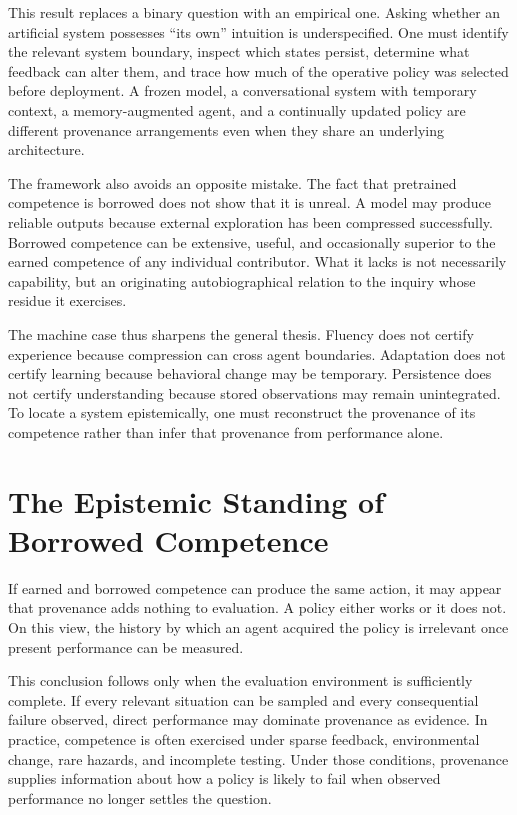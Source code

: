 \documentclass[11pt]{article}
\begin{document}
This result replaces a binary question with an empirical one. Asking whether an artificial system possesses ``its own'' intuition is underspecified. One must identify the relevant system boundary, inspect which states persist, determine what feedback can alter them, and trace how much of the operative policy was selected before deployment. A frozen model, a conversational system with temporary context, a memory-augmented agent, and a continually updated policy are different provenance arrangements even when they share an underlying architecture.

The framework also avoids an opposite mistake. The fact that pretrained competence is borrowed does not show that it is unreal. A model may produce reliable outputs because external exploration has been compressed successfully. Borrowed competence can be extensive, useful, and occasionally superior to the earned competence of any individual contributor. What it lacks is not necessarily capability, but an originating autobiographical relation to the inquiry whose residue it exercises.

The machine case thus sharpens the general thesis. Fluency does not certify experience because compression can cross agent boundaries. Adaptation does not certify learning because behavioral change may be temporary. Persistence does not certify understanding because stored observations may remain unintegrated. To locate a system epistemically, one must reconstruct the provenance of its competence rather than infer that provenance from performance alone.

\section{The Epistemic Standing of Borrowed Competence}

If earned and borrowed competence can produce the same action, it may appear that provenance adds nothing to evaluation. A policy either works or it does not. On this view, the history by which an agent acquired the policy is irrelevant once present performance can be measured.

This conclusion follows only when the evaluation environment is sufficiently complete. If every relevant situation can be sampled and every consequential failure observed, direct performance may dominate provenance as evidence. In practice, competence is often exercised under sparse feedback, environmental change, rare hazards, and incomplete testing. Under those conditions, provenance supplies information about how a policy is likely to fail when observed performance no longer settles the question.
\end{document}
